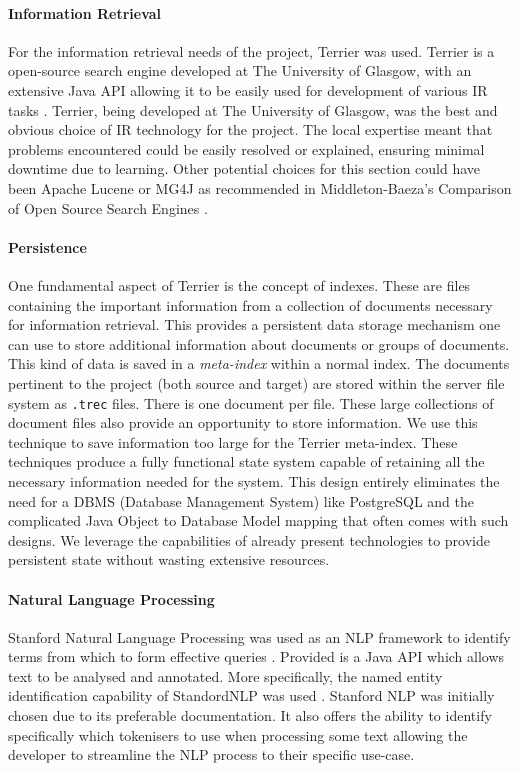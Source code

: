 \documentclass{l4proj}
\newcommand{\code}[1]{\texttt{#1}}
\begin{document}
\paragraph{Information Retrieval}
For the information retrieval needs of the project, Terrier was used. Terrier is a open-source search engine developed at The University of Glasgow, with an extensive Java API allowing it to be easily used for development of various IR tasks \cite{terrier} \cite{macdonald2012puppy}.
Terrier, being developed at The University of Glasgow, was the best and obvious choice of IR technology for the project. The local expertise meant that problems encountered could be easily resolved or explained, ensuring minimal downtime due to learning.
Other potential choices for this section could have been Apache Lucene or MG4J as recommended in Middleton-Baeza's Comparison of Open Source Search Engines \cite{middleton2007comparison}.

\paragraph{Persistence}
One fundamental aspect of Terrier is the concept of indexes. These are files containing the important information from a collection of documents necessary for information retrieval. This provides a persistent data storage mechanism one can use to store additional information about documents or groups of documents. This kind of data is saved in a \textit{meta-index} within a normal index.
The documents pertinent to the project (both source and target) are stored within the server file system as \code{.trec} files. There is one document per file.
These large collections of document files also provide an opportunity to store information. We use this technique to save information too large for the Terrier meta-index.
These techniques produce a fully functional state system capable of retaining all the necessary information needed for the system.
This design entirely eliminates the need for a DBMS (Database Management System) like PostgreSQL and the complicated Java Object to Database Model mapping that often comes with such designs.
We leverage the capabilities of already present technologies to provide persistent state without wasting extensive resources.

\paragraph{Natural Language Processing}
Stanford Natural Language Processing was used as an NLP framework to identify terms from which to form effective queries \cite{manning-EtAl:2014:P14-5}. Provided is a Java API which allows text to be analysed and annotated. More specifically, the named entity identification capability of StandordNLP was used \cite{finkel2005incorporating}.
Stanford NLP was initially chosen due to its preferable documentation. It also offers the ability to identify specifically which tokenisers to use when processing some text allowing the developer to streamline the NLP process to their specific use-case.
\end{document}
